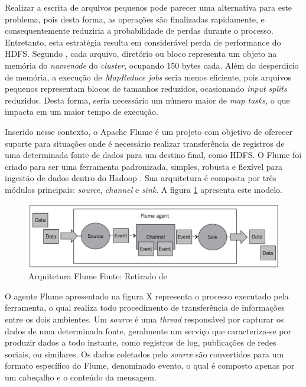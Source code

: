 Realizar a escrita de arquivos pequenos pode parecer uma alternativa para este problema, pois desta forma, as operações são finalizadas rapidamente, e consequentemente reduziria a probabilidade de perdas durante o processo. Entretanto, esta estratégia resulta em considerável perda de performance do HDFS. Segundo , cada arquivo, diretório ou bloco representa um objeto na memória do \textit{namenode} do \textit{cluster}, ocupando 150 bytes cada. Além do desperdício de memória, a execução de \textit{MapReduce} \textit{jobs} seria menos eficiente, pois arquivos pequenos representam blocos de tamanhos reduzidos, ocasionando \textit{input splits} reduzidos. Desta forma, seria necessário um número maior de \textit{map tasks}, o que impacta em um maior tempo de execução.

Inserido nesse contexto, o Apache Flume é um projeto com objetivo de oferecer suporte para situações onde é necessário realizar transferência de registros de uma determinada fonte de dados para um destino final, como HDFS. O Flume foi criado para ser uma ferramenta padronizada, simples, robusta e flexível para ingestão de dados dentro do Hadoop \cite{hoffmanFlume}. Sua arquitetura é composta por três módulos principais: \textit{source}, \textit{channel} e \textit{sink}. A figura \ref{flume-arch} apresenta este modelo.

\begin{figure}[ht!]
	\centering
	\includegraphics[keepaspectratio=true,scale=0.4]
	  {figuras/flume.eps}
	\caption[Arquitetura Flume]{Arquitetura Flume
	\protect\linebreak Fonte: Retirado de \cite{hoffmanFlume}}
	\label{flume-arch}
\end{figure}
\FloatBarrier

O agente Flume apresentado na figura X representa o processo executado pela ferramenta, o qual realiza todo procedimento de transferência de informações entre os dois ambientes. Um \textit{source} é uma \textit{thread} responsável por capturar os dados de uma determinada fonte, geralmente um serviço que caracteriza-se por produzir dados a todo instante, como registros de log, publicações de redes sociais, ou similares. Os dados coletados pelo \textit{source} são convertidos para um formato específico do Flume, denominado evento, o qual é composto apenas por um cabeçalho e o conteúdo da mensagem.

